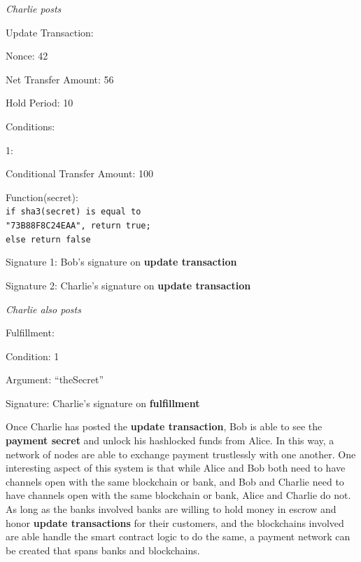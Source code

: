 \documentclass[a4paper]{article}
\newcommand{\bgls}[1]{\textbf{\gls{#1}}}
\newcommand{\bglspl}[1]{\textbf{\glspl{#1}}}
\newenvironment{mydescription}
{\begin{description}
  \setlength{\itemsep}{5pt}
    \setlength{\parskip}{0pt}
    \setlength{\labelsep}{5pt}
}{
\end{description}}
\begin{document}
\begin{mdframed}[style=message]{\emph{Charlie posts}}
\begin{mydescription}
  \item[Update Transaction:] \hfill
  \begin{mydescription}
    \item[Nonce:] 42
    \item[Net Transfer Amount:] 56
    \item[Hold Period:] 10
    \item[Conditions:] \hfill
    \begin{mydescription}
      \item[1:] \hfill
      \begin{mydescription}
        \item[Conditional Transfer Amount:] 100
        \item[Function(secret):] \texttt{\\ if sha3(secret) is equal to\\ "73B88F8C24EAA", return true;\\ else return false}
      \end{mydescription}
    \end{mydescription}
  \end{mydescription}
  \item[Signature 1:] Bob's signature on \bgls{update transaction}
  \item[Signature 2:] Charlie's signature on \bgls{update transaction}
\end{mydescription}
\end{mdframed}

\begin{mdframed}[style=message]{\emph{Charlie also posts}}
\begin{mydescription}
  \item[Fulfillment:] \hfill
  \begin{mydescription}
    \item[Condition:] 1
    \item[Argument:] ``theSecret''
  \end{mydescription}
  \item[Signature:] Charlie's signature on \bgls{fulfillment}
\end{mydescription}
\end{mdframed}

Once Charlie has posted the \bgls{update transaction}, Bob is able to see the \bgls{payment secret} and unlock his hashlocked funds from Alice. In this way, a network of nodes are able to exchange payment trustlessly with one another. One interesting aspect of this system is that while Alice and Bob both need to have channels open with the same blockchain or bank, and Bob and Charlie need to have channels open with the same blockchain or bank, Alice and Charlie do not. As long as the banks involved banks are willing to hold money in escrow and honor \bglspl{update transaction} for their customers, and the blockchains involved are able handle the smart contract logic to do the same, a payment network can be created that spans banks and blockchains.
\end{document}
